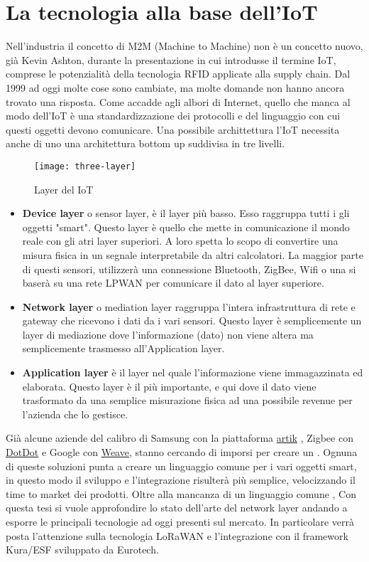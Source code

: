 \section{La tecnologia alla base dell'IoT} 
Nell'industria il concetto di M2M (Machine to Machine) non è un concetto nuovo,
già Kevin Ashton, durante la presentazione in cui introdusse il termine IoT,
comprese le potenzialità della tecnologia RFID applicate alla supply chain. Dal
1999 ad oggi molte cose sono cambiate, ma molte domande non hanno ancora trovato
una risposta. Come accadde agli albori di Internet, quello che manca al modo
dell'IoT è una standardizzazione dei protocolli e del linguaggio con cui questi
oggetti devono comunicare. Una possibile archittettura 
l'IoT necessita anche di uno
una architettura bottom up suddivisa in tre livelli.
\begin{figure}[h]
        \centering 
                \texttt{[image: three-layer]}
        \caption{Layer del IoT}
\end{figure}
\begin{itemize}
\item \textbf{Device layer} o sensor layer, è il layer più basso. Esso raggruppa
tutti i gli oggetti "smart". Questo layer è quello che mette in comunicazione il
mondo reale con gli atri layer superiori. A loro spetta lo scopo di convertire
una misura fisica in un segnale interpretabile da altri calcolatori.
La maggior parte di questi sensori, utilizzerà una connessione Bluetooth,
ZigBee, Wifi o una si baserà su una rete LPWAN per comunicare il dato al layer
superiore.
\item \textbf{Network layer} o mediation layer raggruppa l'intera infrastruttura
di rete e gateway che ricevono i dati da i vari sensori. Questo layer è
semplicemente un layer di mediazione dove l'informazione (dato) non viene altera
ma semplicemente trasmesso all'Application layer.
\item \textbf{Application layer} è il layer nel quale l'informazione viene
immagazzinata ed elaborata. Questo layer è il più importante, e qui dove il dato
viene trasformato da una semplice misurazione fisica ad una possibile revenue
per l'azienda che lo gestisce.
\end{itemize}


Già alcune aziende del calibro di Samsung con la
piattaforma \href{https://www.artik.io}{artik}  , Zigbee con
\href{https://www.speakdotdot.com/dotdot/}{DotDot} e Google con
\href{https://developers.nest.com/weave/}{Weave}, stanno cercando di imporsi per
creare un .
Ognuna di queste soluzioni punta a creare un linguaggio comune per i vari
oggetti smart, in questo modo il sviluppo e l'integrazione risulterà più
semplice, velocizzando il time to market dei prodotti.
Oltre alla mancanza di un linguaggio comune , Con questa tesi si vuole approfondire lo stato dell'arte del network layer
andando a esporre le principali tecnologie ad oggi presenti sul mercato. In
particolare verrà posta l'attenzione sulla tecnologia LoRaWAN e l'integrazione
con il framework Kura/ESF sviluppato da Eurotech.



